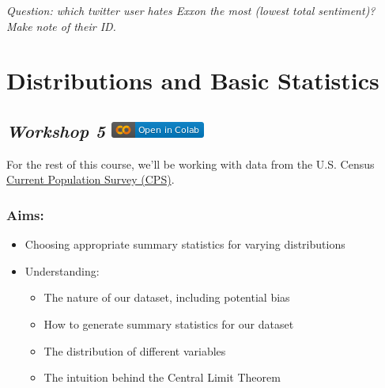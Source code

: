 \documentclass[
  letterpaper,
  DIV=11,
  numbers=noendperiod]{scrreprt}
\providecommand{\tightlist}{%
  \setlength{\itemsep}{0pt}\setlength{\parskip}{0pt}}\usepackage{longtable,booktabs,array}
\begin{document}
\emph{Question: which twitter user hates Exxon the most (lowest total
sentiment)? Make note of their ID.}


\hypertarget{distributions-and-basic-statistics}{%
\chapter{Distributions and Basic
Statistics}\label{distributions-and-basic-statistics}}

\hypertarget{workshop-5-open-in-colab}{%
\section[\emph{Workshop 5} ]{\texorpdfstring{\emph{Workshop 5}
\href{https://colab.research.google.com/github/oballinger/QM2/blob/main/notebooks/W05.\%20Distributions\%20and\%20Basic\%20Statistics.ipynb}{\protect\includegraphics{index_files/mediabag/colab-badge.png}}}{Workshop 5 Open In Colab}}\label{workshop-5-open-in-colab}}

For the rest of this course, we'll be working with data from the U.S.
Census \href{https://www.census.gov/programs-surveys/cps.html}{Current
Population Survey (CPS)}.

\hypertarget{aims-2}{%
\subsection{Aims:}\label{aims-2}}

\begin{itemize}
\item
  Choosing appropriate summary statistics for varying distributions
\item
  Understanding:

  \begin{itemize}
  \tightlist
  \item
    The nature of our dataset, including potential bias
  \item
    How to generate summary statistics for our dataset
  \item
    The distribution of different variables
  \item
    The intuition behind the Central Limit Theorem
  \end{itemize}
\end{itemize}
\end{document}
